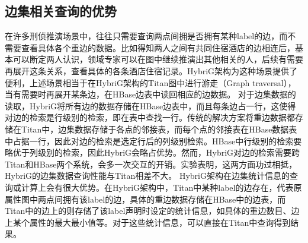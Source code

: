 \subsection{边集相关查询的优势}
在许多刑侦推演场景中，往往只需要查询两点间拥是否拥有某种label的边，而不需要查看具体各个重边的数据。比如得知两人之间有共同住宿酒店的边相连后，基本可以断定两人认识，领域专家可以在图中继续推演出其他相关的人，后续有需要再展开这条关系，查看具体的各条酒店住宿记录。HybriG架构为这种场景提供了便利，上述场景相当于在HybriG架构的Titan图中进行游走（Graph traversal），当有需要时再展开某条边，在HBase边表中读回相应的边数据。
对于边集数据的读取，HybriG将所有边的数据存储在HBase边表中，而且每条边占一行，这使得对边的检索是行级别的检索，即在表中查找一行。传统的解决方案将重边数据都存储在Titan中，边集数据存储于各点的邻接表，而每个点的邻接表在HBase数据表中占据一行，因此对边的检索是选定行后的列级别检索。HBase中行级别的检索要略优于列级别的检索，因此HybriG会略占优势。然而，HybriG对边的检索需要跨Titan和HBase两个系统，会多一次交互的开销。实验表明，这两方面功过相抵，HybriG的边集数据查询性能与Titan相差不大。
HybriG架构在边集统计信息的查询或计算上会有很大优势。在HybriG架构中，Titan中某种label的边存在，代表原属性图中两点间拥有该label的边，具体的重边数据存储在HBase中的边表，而Titan中的边上的则存储了该label声明时设定的统计信息，如具体的重边数目、边上某个属性的最大最小值等。对于这些统计信息，可以直接在Titan中查询得到结果。



